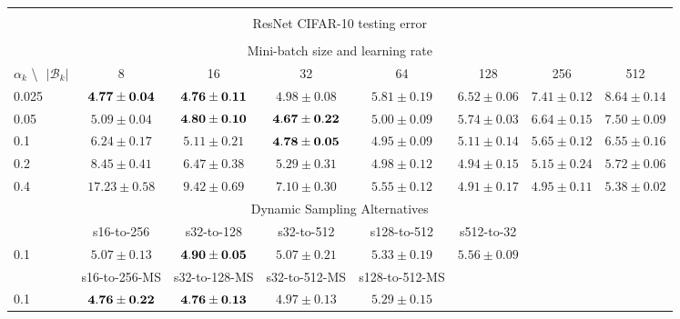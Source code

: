 \documentclass[10pt,journal,compsoc]{IEEEtran}
\begin{document}
\begin{table*}[!htbp]
\begin{center}
{\begin{tabular}{|l|c|c|c|c|c|c|c|}
\multicolumn{8}{|c|}{} \\
\multicolumn{8}{|c|}{ResNet CIFAR-10 testing error} \\
\multicolumn{8}{|c|}{} \\
\hline
\multicolumn{8}{|c|}{Mini-batch size and learning rate} \\
\hline
$\alpha_k$ \textbackslash $ \text{   } {|\mathcal{B}_k|}$ & 8 & 16 & 32 & 64 & 128 & 256 & 512 \\
\hline
0.025 &  $\bf 4.77 \pm 0.04$ & $\bf 4.76 \pm 0.11$ & $4.98 \pm 0.08$ & $5.81 \pm 0.19$ & $6.52 \pm 0.06$ & $7.41 \pm 0.12$ & $8.64 \pm 0.14$ \\
\hline
0.05  & $5.09\pm0.04$ & $\bf 4.80\pm0.10$ & $\bf 4.67\pm0.22$ & $5.00\pm0.09$ & $5.74\pm0.03$ & $6.64\pm0.15$ & $7.50\pm0.09$ \\
\hline
0.1   & $6.24\pm0.17$ & $5.11\pm0.21$ & $\bf 4.78\pm0.05$ & $4.95\pm0.09$ & $5.11\pm0.14$ & $5.65\pm0.12$ & $6.55\pm0.16$ \\
\hline
0.2   & $8.45\pm0.41$ & $6.47\pm0.38$ & $5.29\pm0.31$ & $4.98\pm0.12$ & $4.94\pm0.15$ & $5.15\pm0.24$ & $5.72\pm0.06$ \\
\hline
0.4   & $17.23\pm0.58$ & $9.42\pm0.69$ & $7.10\pm0.30$ & $5.55\pm0.12$ & $4.91\pm0.17$ & $4.95\pm0.11$ & $5.38\pm0.02$ \\
\hline
\multicolumn{8}{|c|}{Dynamic Sampling Alternatives}\\
\hline
& s16-to-256  & s32-to-128 & s32-to-512 & s128-to-512 & s512-to-32 & & \\
\hline
0.1   & $5.07\pm0.13$ & $\bf 4.90\pm0.05$ & $5.07\pm0.21$ & $5.33\pm0.19$ & $5.56\pm0.09$ & & \\
\hline
& s16-to-256-MS & s32-to-128-MS & s32-to-512-MS & s128-to-512-MS & & & \\
\hline
0.1 & $\bf 4.76\pm0.22$ & $\bf 4.76\pm0.13$ & $4.97\pm0.13$ & $5.29\pm0.15$ & & &\\
\hline
\end{tabular}}
\end{center}
\end{table*}
\end{document}

